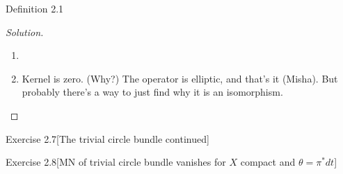\begin{thing3}{Definition 2.1}
\begin{proof}[Solution]
\begin{enumerate}
\item 

\item Kernel is zero. (Why?) The operator is elliptic, and that's it (Misha). But probably there's a way to just find why it is an isomorphism.
\end{enumerate}
\end{proof}

\begin{thing4}{Exercise 2.7}[The trivial circle bundle continued]\label{exer:2.7}\leavevmode

\end{thing4}

\begin{thing4}{Exercise 2.8}[MN of trivial circle bundle vanishes for \(X\) compact and \(\theta=\pi^*dt\)]\label{exer:2.8}\leavevmode

\end{thing4}

\end{thing3}













